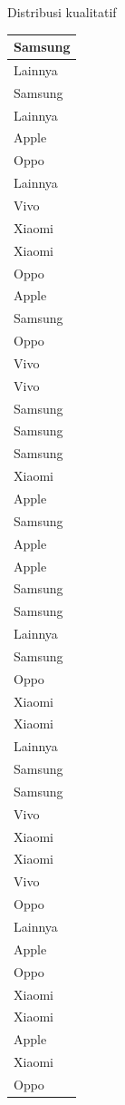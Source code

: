 \documentclass[
  ignorenonframetext,
]{beamer}
\begin{document}
\begin{frame}[s]{Distribusi kualitatif}
\begin{table}
\begin{tabular}[t]{l}
\hline
Samsung\\
\hline
Lainnya\\
\hline
Samsung\\
\hline
Lainnya\\
\hline
Apple\\
\hline
Oppo\\
\hline
Lainnya\\
\hline
Vivo\\
\hline
Xiaomi\\
\hline
Xiaomi\\
\hline
Oppo\\
\hline
Apple\\
\hline
Samsung\\
\hline
Oppo\\
\hline
Vivo\\
\hline
Vivo\\
\hline
Samsung\\
\hline
Samsung\\
\hline
Samsung\\
\hline
Xiaomi\\
\hline
Apple\\
\hline
Samsung\\
\hline
Apple\\
\hline
Apple\\
\hline
Samsung\\
\hline
Samsung\\
\hline
Lainnya\\
\hline
Samsung\\
\hline
Oppo\\
\hline
Xiaomi\\
\hline
Xiaomi\\
\hline
Lainnya\\
\hline
Samsung\\
\hline
Samsung\\
\hline
Vivo\\
\hline
Xiaomi\\
\hline
Xiaomi\\
\hline
Vivo\\
\hline
Oppo\\
\hline
Lainnya\\
\hline
Apple\\
\hline
Oppo\\
\hline
Xiaomi\\
\hline
Xiaomi\\
\hline
Apple\\
\hline
Xiaomi\\
\hline
Oppo\\

\end{tabular}
\end{table}
\end{frame}
\end{document}
